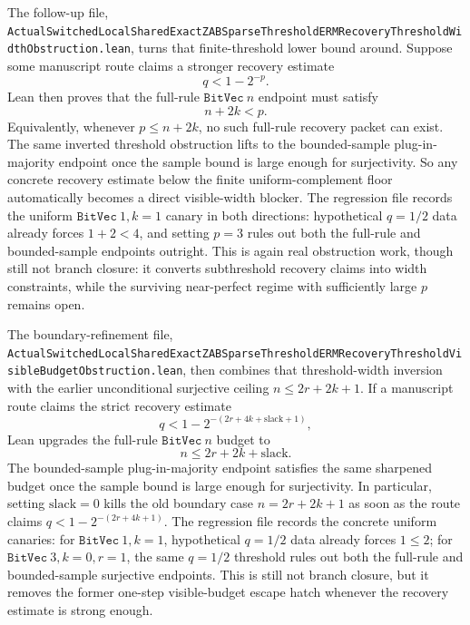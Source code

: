 \documentclass[11pt]{article}
\theoremstyle{remark}
\begin{document}
The follow-up file,
\texttt{ActualSwitchedLocalSharedExactZABSparseThresholdERMRecoveryThresholdWidthObstruction.lean},
turns that finite-threshold lower bound around.  Suppose some manuscript route
claims a stronger recovery estimate
\[
  q < 1 - 2^{-p}.
\]
Lean then proves that the full-rule \(\texttt{BitVec}\ n\) endpoint must satisfy
\[
  n + 2k < p.
\]
Equivalently, whenever \(p \le n + 2k\), no such full-rule recovery packet can
exist.  The same inverted threshold obstruction lifts to the bounded-sample
plug-in-majority endpoint once the sample bound is large enough for
surjectivity.  So any concrete recovery estimate below the finite
uniform-complement floor automatically becomes a direct visible-width blocker.
The regression file records the uniform \(\texttt{BitVec}\ 1, k=1\) canary in
both directions: hypothetical \(q=1/2\) data already forces \(1+2<4\), and
setting \(p=3\) rules out both the full-rule and bounded-sample endpoints
outright.  This is again real obstruction work, though still not branch
closure: it converts subthreshold recovery claims into width constraints, while
the surviving near-perfect regime with sufficiently large \(p\) remains open.

The boundary-refinement file,
\texttt{ActualSwitchedLocalSharedExactZABSparseThresholdERMRecoveryThresholdVisibleBudgetObstruction.lean},
then combines that threshold-width inversion with the earlier unconditional
surjective ceiling \(n \le 2r + 2k + 1\).  If a manuscript route claims the
strict recovery estimate
\[
  q < 1 - 2^{-(2r + 4k + \mathrm{slack} + 1)},
\]
Lean upgrades the full-rule \(\texttt{BitVec}\ n\) budget to
\[
  n \le 2r + 2k + \mathrm{slack}.
\]
The bounded-sample plug-in-majority endpoint satisfies the same sharpened
budget once the sample bound is large enough for surjectivity.  In particular,
setting \(\mathrm{slack}=0\) kills the old boundary case
\(n = 2r + 2k + 1\) as soon as the route claims
\(q < 1 - 2^{-(2r + 4k + 1)}\).  The regression file records the concrete
uniform canaries: for \(\texttt{BitVec}\ 1, k=1\), hypothetical \(q=1/2\)
data already forces \(1 \le 2\); for \(\texttt{BitVec}\ 3, k=0, r=1\), the
same \(q=1/2\) threshold rules out both the full-rule and bounded-sample
surjective endpoints.  This is still not branch closure, but it removes the
former one-step visible-budget escape hatch whenever the recovery estimate is
strong enough.
\end{document}

